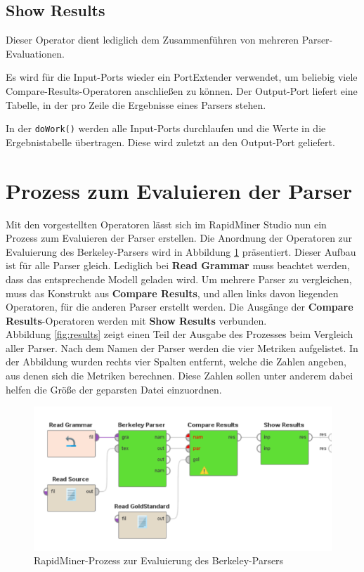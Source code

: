 \subsection{Show Results}

Dieser Operator dient lediglich dem Zusammenführen von mehreren Parser-Evaluationen. 

Es wird für die Input-Ports wieder ein PortExtender verwendet, um beliebig viele Compare-Results-Operatoren anschließen zu können. Der Output-Port liefert eine Tabelle, in der pro Zeile die Ergebnisse eines Parsers stehen.

In der \texttt{doWork()} werden alle Input-Ports durchlaufen und die Werte in die Ergebnistabelle übertragen. Diese wird zuletzt an den Output-Port geliefert.


\section{Prozess zum Evaluieren der Parser}

Mit den vorgestellten Operatoren lässt sich im RapidMiner Studio nun ein Prozess zum Evaluieren der Parser erstellen. Die Anordnung der Operatoren zur Evaluierung des Berkeley-Parsers wird in Abbildung \ref{fig:screenshot-prozess} präsentiert. Dieser Aufbau ist für alle Parser gleich. Lediglich bei \textbf{Read Grammar} muss beachtet werden, dass das entsprechende Modell geladen wird. Um mehrere Parser zu vergleichen,  muss das Konstrukt aus \textbf{Compare Results}, und allen links davon liegenden Operatoren, für die anderen Parser erstellt werden. Die Ausgänge der \textbf{Compare Results}-Operatoren werden mit \textbf{Show Results} verbunden. \\
Abbildung \ref{fig:results} zeigt einen Teil der Ausgabe des Prozesses beim Vergleich aller Parser. Nach dem Namen der Parser werden die vier Metriken aufgelistet. In der Abbildung wurden rechts vier Spalten entfernt, welche die Zahlen angeben, aus denen sich die Metriken berechnen. Diese Zahlen sollen unter anderem dabei helfen die Größe der geparsten Datei einzuordnen.

\begin{figure}
\includegraphics[width=\textwidth]{gfx/berkeley-skizze.png} 
\caption{RapidMiner-Prozess zur Evaluierung des Berkeley-Parsers}	
\label{fig:screenshot-prozess}	
\end{figure}

